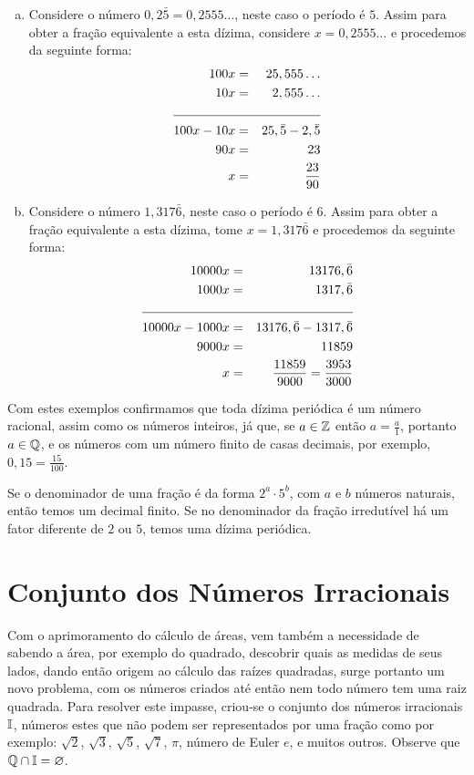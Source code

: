 \begin{exem}
\begin{enumerate}[a)]
   \item Considere o número $0,2\bar{5}= 0,2555 \ldots$, neste caso o período é $5$. Assim para obter a fração equivalente a esta dízima, considere $x=  0,2555 \ldots$ e procedemos da seguinte forma:
   \begin{eqnarray*}
    100x &=& 25,555 \ldots \\
    10x &=& 2,555 \ldots \\\cline{1-3}
    100x - 10x &=& 25,\bar{5} - 2, \bar{5} \\
    90x &=& 23 \\
    x&=& \frac{23}{90}
   \end{eqnarray*}

   \item Considere o número $1,317\bar{6}$, neste caso o período é $6$. Assim para obter a fração equivalente a esta dízima, tome $x=1,317\bar{6}$ e procedemos da seguinte forma:
   \begin{eqnarray*}
    10000 x &=& 13176, \bar{6} \\
    1000 x &=& 1317,\bar{6}\\\cline{1-3}
    10000 x - 1000 x &=& 13176, \bar{6} - 1317,\bar{6}\\
    9000 x &=& 11859 \\
    x &=& \frac{11859}{9000} = \frac{3953}{3000}
   \end{eqnarray*}

  \end{enumerate}

 \end{exem}

Com estes exemplos confirmamos que toda dízima periódica é um número racional, assim como os números inteiros, já que, se $a \in \mathbb{Z}$ então $a=\frac{a}{1}$, portanto $a \in \mathbb{Q}$, e os números com um número finito de casas decimais, por exemplo, $0,15= \frac{15}{100}$.

\begin{obs}
    Se o denominador de uma fração é da forma $2^a\cdot 5^b$, com $a$ e $b$ números naturais, então temos um decimal finito. Se no denominador da fração irredutível há um fator diferente de $2$ ou $5$, temos uma dízima periódica.
\end{obs}

\section{Conjunto dos Números Irracionais}

Com o aprimoramento do cálculo de áreas, vem também a necessidade de sabendo a área, por exemplo do quadrado, descobrir quais as medidas de seus lados, dando então origem ao cálculo das raízes quadradas, surge portanto um novo problema, com os números criados até então nem todo número tem uma raiz quadrada. Para resolver este impasse, criou-se o conjunto dos números irracionais $\mathbb{I}$, números estes que não podem ser representados por uma fração como por exemplo: $\sqrt{2}$, $\sqrt{3}$, $\sqrt{5}$, $\sqrt{7}$, $\pi$, número de Euler $e$, e muitos outros. Observe que $\mathbb{Q} \cap \mathbb{I} = \varnothing$.

